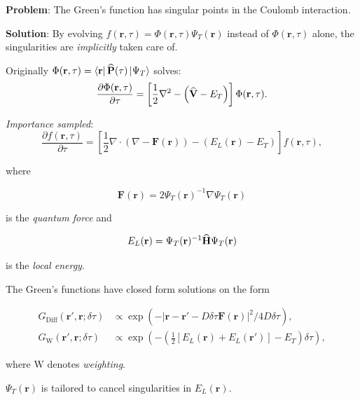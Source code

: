 \begin{frame}
 \textbf{Problem}: The Green's function has singular points in the Coulomb interaction.
 \shift
 
 \textbf{Solution}: By evolving $f(\mathbf{r}, \tau) = \Phi(\mathbf{r}, \tau)\Psi_T(\mathbf{r})$ instead of $\Phi(\mathbf{r}, \tau)$ alone, the singularities are \emph{implicitly} taken care of.
  
 \end{frame}

 \begin{frame}
   Originally $\Phi(\mathbf{r}, \tau) = \left< \mathbf{r} \right|{\bf\widehat{P}}(\tau)\left| \Psi_T \right>$ solves:
 \begin{equation*}
  \frac{\partial \Phi(\mathbf{r}, \tau)}{\partial\tau} = \left[\frac{1}{2}\nabla^2 - \left({\bf\widehat{V}} - E_T\right)\right]\Phi(\mathbf{r}, \tau).
 \end{equation*}
 
 \pause
 
 \textit{Importance sampled}:
  \begin{equation*}
  \frac{\partial f(\mathbf{r}, \tau)}{\partial\tau} = \left[\frac{1}{2}\nabla\cdot\left(\nabla - \mathbf{F}(\mathbf{r})\right) - (E_L(\mathbf{r}) - E_T)\right]f(\mathbf{r}, \tau),
 \end{equation*}
 
 where
 
\begin{equation*}
  \mathbf{F}(\mathbf{r}) =  2\Psi_T(\mathbf{r})^{-1}\nabla \Psi_T(\mathbf{r})
\end{equation*}

is the \textit{quantum force} and 

\begin{equation*} 
E_L(\mathbf{r}) = \Psi_T(\mathbf{r})^{-1}{\bf\widehat{H}}\Psi_T(\mathbf{r})
\end{equation*}

is the \textit{local energy}. 

\end{frame}

\begin{frame}
 The Green's functions have closed form solutions on the form
 
 \begin{align*}
  G_{\mathrm{Diff}}(\mathbf{r}', \mathbf{r}; \delta\tau) &\propto \exp\left(-\left|\mathbf{r}-\mathbf{r}' - D\delta\tau \mathbf{F}(\mathbf{r})\right|^2/4D\delta\tau\right), \\
  G_{\mathrm{W}}(\mathbf{r}', \mathbf{r}; \delta\tau) &\propto \exp\left(-\left(\frac{1}{2}\left[E_L(\mathbf{r}) + E_L(\mathbf{r}')\right] - E_T\right)\delta\tau\right),
 \end{align*}

 where $\mathrm{W}$ denotes \textit{weighting}.
 \shift
 
 $\Psi_T(\mathbf{r})$ is tailored to cancel singularities in $E_L(\mathbf{r})$. 
 
 
\end{frame}

